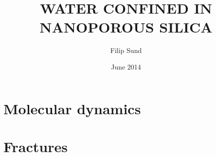 \documentclass[twoside,english,a4paper,12pt]{uiofysmaster}
\author{Filip Sund}
\title{\uppercase{Water confined in\\ nanoporous silica}}
\date{June 2014}
\begin{document}

\cleardoublepage


% 


\tableofcontents



\part{Molecular dynamics}
    
    
        
        
        
        
        
        
    
        
        
        
    
        
        

\part{Fractures}
    
    
        
        
    
        
        
            
            
            
            
        
            
\end{document}
